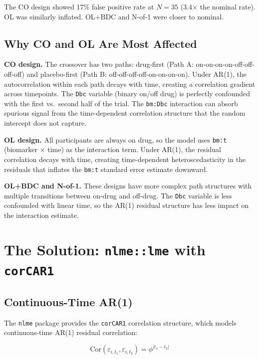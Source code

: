 \documentclass[11pt]{article}
\begin{document}
The CO design showed 17\% false positive rate at $N = 35$
(3.4$\times$ the nominal rate). OL was similarly inflated.
OL+BDC and N-of-1 were closer to nominal.

\subsection{Why CO and OL Are Most Affected}

\textbf{CO design.} The crossover has two paths: drug-first
(Path A: on-on-on-on-off-off-off-off) and placebo-first
(Path B: off-off-off-off-on-on-on-on). Under AR(1), the
autocorrelation within each path decays with time, creating
a correlation gradient across timepoints. The \texttt{Dbc}
variable (binary on/off drug) is perfectly confounded with
the first vs.\ second half of the trial. The \texttt{bm:Dbc}
interaction can absorb spurious signal from the time-dependent
correlation structure that the random intercept does not
capture.

\textbf{OL design.} All participants are always on drug, so
the model uses \texttt{bm:t} (biomarker $\times$ time) as
the interaction term. Under AR(1), the residual correlation
decays with time, creating time-dependent heteroscedasticity
in the residuals that inflates the \texttt{bm:t} standard
error estimate downward.

\textbf{OL+BDC and N-of-1.} These designs have more complex
path structures with multiple transitions between on-drug and
off-drug. The \texttt{Dbc} variable is less confounded with
linear time, so the AR(1) residual structure has less impact
on the interaction estimate.

\section{The Solution: \texttt{nlme::lme} with \texttt{corCAR1}}

\subsection{Continuous-Time AR(1)}

The \texttt{nlme} package provides the \texttt{corCAR1}
correlation structure, which models continuous-time AR(1)
residual correlation:

\[
\text{Cor}(\varepsilon_{i,t_1}, \varepsilon_{i,t_2}) =
\phi^{|t_1 - t_2|}
\]
\end{document}
